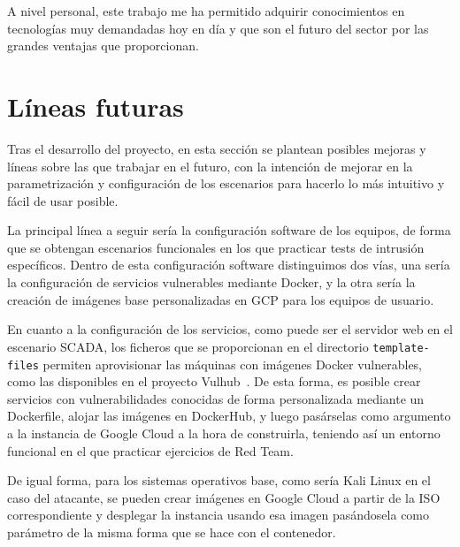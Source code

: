   A nivel personal, este trabajo me ha permitido adquirir conocimientos en tecnologías muy demandadas hoy en día y que son el futuro del sector por las grandes ventajas que proporcionan. 

\section{Líneas futuras} \label{sec:fut}
  Tras el desarrollo del proyecto, en esta sección se plantean posibles mejoras y líneas sobre las que trabajar en el futuro, con la intención de mejorar en la parametrización y configuración de los escenarios para hacerlo lo más intuitivo y fácil de usar posible.

  La principal línea a seguir sería la configuración software de los equipos, de forma que se obtengan escenarios funcionales en los que practicar tests de intrusión específicos. Dentro de esta configuración software distinguimos dos vías, una sería la configuración de servicios vulnerables mediante Docker, y la otra sería la creación de imágenes base personalizadas en GCP para los equipos de usuario.

  En cuanto a la configuración de los servicios, como puede ser el servidor web en el escenario SCADA, los ficheros que se proporcionan en el directorio \texttt{template-files} permiten aprovisionar las máquinas con imágenes Docker vulnerables, como las disponibles en el proyecto Vulhub~\cite{con1}. De esta forma, es posible crear servicios con vulnerabilidades conocidas de forma personalizada mediante un Dockerfile, alojar las imágenes en DockerHub, y luego pasárselas como argumento a la instancia de Google Cloud a la hora de construirla, teniendo así un entorno funcional en el que practicar ejercicios de Red Team. 

  De igual forma, para los sistemas operativos base, como sería Kali Linux en el caso del atacante, se pueden crear imágenes en Google Cloud a partir de la ISO correspondiente y desplegar la instancia usando esa imagen pasándosela como parámetro de la misma forma que se hace con el contenedor.
